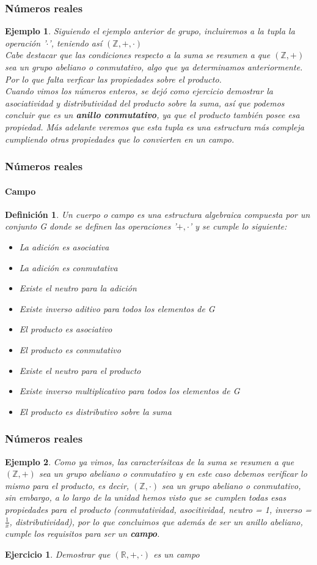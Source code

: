 \documentclass[11pt]{beamer}
\newtheorem{defi}{Definición}
\newtheorem{eje}{Ejercicio}
\newtheorem{ejem}{Ejemplo}
\begin{document}
\begin{frame}
\frametitle{Números reales}
\begin{ejem}
Siguiendo el ejemplo anterior de grupo, incluiremos a la tupla la operación '$\cdot$', teniendo así $(\mathbb{Z},+,\cdot)$\\
Cabe destacar que las condiciones respecto a la suma se resumen a que $(\mathbb{Z},+)$ sea un grupo abeliano o conmutativo, algo que ya determinamos anteriormente. Por lo que falta verficar las propiedades sobre el producto.\\
Cuando vimos los números enteros, se dejó como ejercicio demostrar la asociatividad y distributividad del producto sobre la suma, así que podemos concluir que es un \textbf{anillo conmutativo}, ya que el producto también posee esa propiedad. Más adelante veremos que esta tupla es una estructura más compleja cumpliendo otras propiedades que lo convierten en un campo.
\end{ejem}
\end{frame}

\begin{frame}
\frametitle{Números reales}
\framesubtitle{Campo}
\begin{defi}
Un cuerpo o campo es una estructura algebraica compuesta por un conjunto G donde se definen las operaciones '$+,\cdot$' y se cumple lo siguiente: 
\\
\begin{itemize}
\item La adición es asociativa
\item La adición es conmutativa
\item Existe el neutro para la adición
\item Existe inverso aditivo para todos los elementos de G
\item El producto es asociativo
\item El producto es conmutativo
\item Existe el neutro para el producto
\item Existe inverso multiplicativo para todos los elementos de G
\item El producto es distributivo sobre la suma
\end{itemize}
\end{defi}
\end{frame}

\begin{frame}
\frametitle{Números reales}
\begin{ejem}
Como ya vimos, las caracterísitcas de la suma se resumen a que $(\mathbb{Z},+)$ sea un grupo abeliano o conmutativo y en este caso debemos verificar lo mismo para el producto, es decir, $(\mathbb{Z},\cdot)$ sea un grupo abeliano o conmutativo, sin embargo, a lo largo de la unidad hemos visto que se cumplen todas esas propiedades para el producto (conmutatividad, asocitividad, neutro = 1, inverso = $\frac{1}{x}$, distributividad), por lo que concluimos que además de ser un anillo abeliano, cumple los requisitos para ser un \textbf{campo}. 
\end{ejem}
\begin{eje}
Demostrar que $(\mathbb{R},+,\cdot)$ es un campo
\end{eje}
\end{frame}
\end{document}
